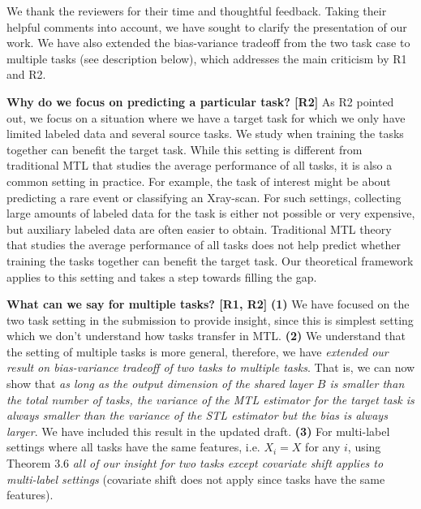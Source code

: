 \documentclass{article}
\begin{document}
We thank the reviewers for their time and thoughtful feedback.
Taking their helpful comments into account, we have sought to clarify the presentation of our work.
We have also extended the bias-variance tradeoff from the two task case to multiple tasks (see description below), which addresses the main criticism by R1 and R2.

\textbf{Why do we focus on predicting a particular task? [R2]}
As R2 pointed out, we focus on a situation where we have a target task for which we only have limited labeled data and several source tasks.
We study when training the tasks together can benefit the target task.
While this setting is different from traditional MTL that studies the average performance of all tasks, it is also a common setting in practice. For example, the task of interest might be about predicting a rare event or classifying an Xray-scan.
For such settings, collecting large amounts of labeled data for the task is either not possible or very expensive, but auxiliary labeled data are often easier to obtain.
Traditional MTL theory that studies the average performance of all tasks does not help predict whether training the tasks together can benefit the target task.
Our theoretical framework applies to this setting and takes a step towards filling the gap.

\textbf{What can we say for multiple tasks? [R1, R2]}
\textbf{(1)} We have focused on the two task setting in the submission to provide insight, since this is simplest setting which we don't understand how tasks transfer in MTL.
\textbf{(2)} We understand that the setting of multiple tasks is more general, therefore, we have \textit{extended our result on bias-variance tradeoff of two tasks to multiple tasks}.
That is, we can now show that \textit{as long as the output dimension of the shared layer $B$ is smaller than the total number of tasks, the variance of the MTL estimator for the target task is always smaller than the variance of the STL estimator but the bias is always larger}.
We have included this result in the updated draft.
\textbf{(3)} For multi-label settings where all tasks have the same features, i.e. $X_i = X$ for any $i$, using Theorem 3.6 \textit{all of our insight for two tasks except covariate shift applies to multi-label settings} (covariate shift does not apply since tasks have the same features).
\end{document}
